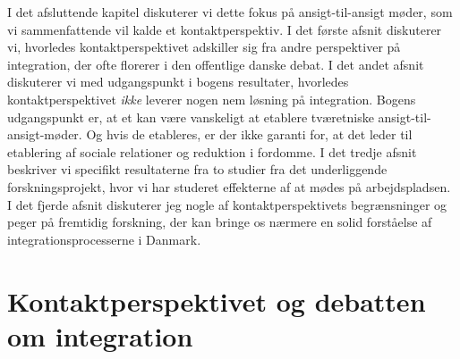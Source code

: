 \documentclass[
]{book}
\begin{document}
I det afsluttende kapitel diskuterer vi dette fokus på ansigt-til-ansigt møder, som vi sammenfattende vil kalde et kontaktperspektiv. I det første afsnit diskuterer vi, hvorledes kontaktperspektivet adskiller sig fra andre perspektiver på integration, der ofte florerer i den offentlige danske debat. I det andet afsnit diskuterer vi med udgangspunkt i bogens resultater, hvorledes kontaktperspektivet \emph{ikke} leverer nogen nem løsning på integration. Bogens udgangspunkt er, at et kan være vanskeligt at etablere tværetniske ansigt-til-ansigt-møder. Og hvis de etableres, er der ikke garanti for, at det leder til etablering af sociale relationer og reduktion i fordomme. I det tredje afsnit beskriver vi specifikt resultaterne fra to studier fra det underliggende forskningsprojekt, hvor vi har studeret effekterne af at mødes på arbejdspladsen. I det fjerde afsnit diskuterer jeg nogle af kontaktperspektivets begrænsninger og peger på fremtidig forskning, der kan bringe os nærmere en solid forståelse af integrationsprocesserne i Danmark.

\section{Kontaktperspektivet og debatten om integration}\label{kontaktperspektivet-og-debatten-om-integration}
\end{document}
